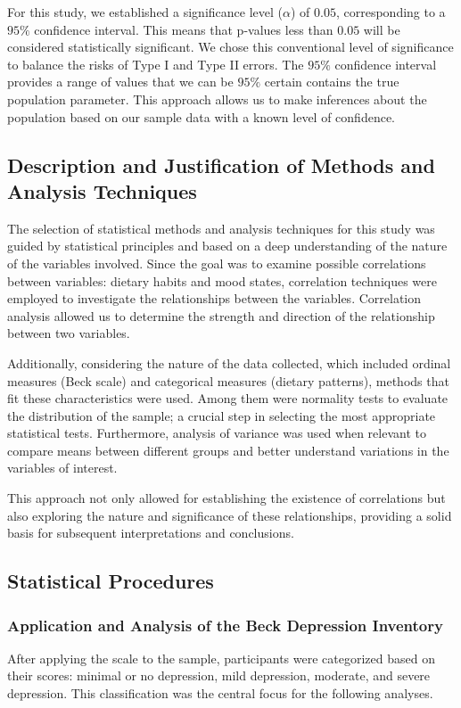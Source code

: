\documentclass[jou]{apa7}
\begin{document}
For this study, we established a significance level ($\alpha$) of $0.05$, corresponding to a $95\%$ confidence interval. This means that p-values less than $0.05$ will be considered statistically significant. We chose this conventional level of significance to balance the risks of Type I and Type II errors. The $95\%$ confidence interval provides a range of values that we can be $95\%$ certain contains the true population parameter. This approach allows us to make inferences about the population based on our sample data with a known level of confidence.


\subsection{Description and Justification of Methods and Analysis Techniques}\label{descripciuxf3n-y-justificaciuxf3n-de-muxe9todos-y-tuxe9cnicas-de-anuxe1lisis}

The selection of statistical methods and analysis techniques for this study was guided by statistical principles and based on a deep understanding of the nature of the variables involved. Since the goal was to examine possible correlations between variables: dietary habits and mood states, correlation techniques were employed to investigate the relationships between the variables. Correlation analysis allowed us to determine the strength and direction of the relationship between two variables.

Additionally, considering the nature of the data collected, which included ordinal measures (Beck scale) and categorical measures (dietary patterns), methods that fit these characteristics were used. Among them were normality tests to evaluate the distribution of the sample; a crucial step in selecting the most appropriate statistical tests. Furthermore, analysis of variance was used when relevant to compare means between different groups and better understand variations in the variables of interest.

This approach not only allowed for establishing the existence of correlations but also exploring the nature and significance of these relationships, providing a solid basis for subsequent interpretations and conclusions.

\subsection{Statistical Procedures}\label{procedimientos-estaduxedsticos}

\subsubsection{Application and Analysis of the Beck Depression Inventory}
After applying the scale to the sample, participants were categorized based on their scores: minimal or no depression, mild depression, moderate, and severe depression. This classification was the central focus for the following analyses.
\end{document}
